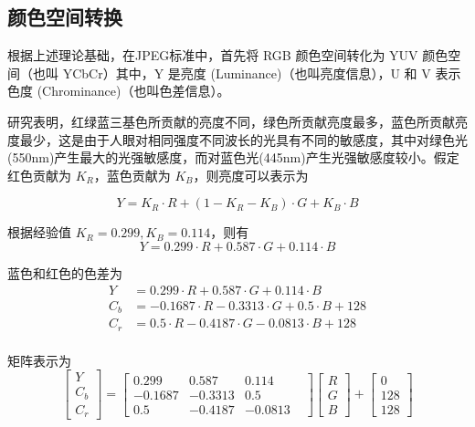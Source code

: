 \subsection{颜色空间转换}
根据上述理论基础，在JPEG标准中，首先将 RGB 颜色空间转化为 YUV 颜色空间（也叫 YCbCr）其中，Y 是亮度 (Luminance)（也叫亮度信息），U 和 V 表示色度 (Chrominance)（也叫色差信息）。

研究表明，红绿蓝三基色所贡献的亮度不同，绿色所贡献亮度最多，蓝色所贡献亮度最少，这是由于人眼对相同强度不同波长的光具有不同的敏感度，其中对绿色光(550nm)产生最大的光强敏感度，而对蓝色光(445nm)产生光强敏感度较小。假定红色贡献为 $K_R$，蓝色贡献为 $K_B$，则亮度可以表示为

\begin{equation}
    Y = K_R \cdot R + (1-K_R-K_B) \cdot G + K_B \cdot B
    \label{Eq.yuv}
\end{equation}

根据经验值 $K_R=0.299, K_B=0.114$，则有
\begin{equation}
    Y = 0.299 \cdot R + 0.587 \cdot G + 0.114 \cdot B
\end{equation}

蓝色和红色的色差为
\begin{equation}
    \begin{aligned}
        Y   &= 0.299   \cdot R + 0.587    \cdot G + 0.114 \cdot B \\
        C_b &= -0.1687 \cdot R - 0.3313   \cdot G + 0.5 \cdot B +128\\
        C_r &= 0.5   \cdot R - 0.4187   \cdot G - 0.0813 \cdot B +128\\
    \end{aligned}    
\end{equation}

矩阵表示为
\begin{equation}
    \begin{bmatrix}
        Y \\ C_b \\ C_r
    \end{bmatrix}
    =\begin{bmatrix}
        0.299   & 0.587    & 0.114 & \\
        -0.1687 & -0.3313   & 0.5 & \\
        0.5     & -0.4187   & -0.0813 &
    \end{bmatrix}
    \begin{bmatrix}
        R \\ G \\ B
    \end{bmatrix}
    +\begin{bmatrix}
        0 \\ 128 \\ 128
    \end{bmatrix}
\end{equation}


